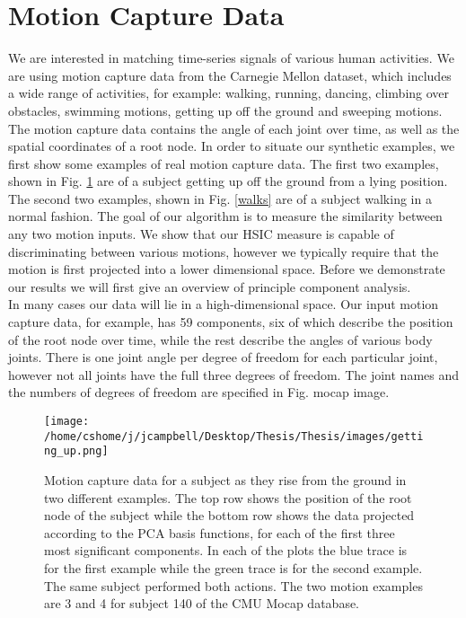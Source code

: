 \section{Motion Capture Data}

We are interested in matching time-series signals of various human activities. We are using motion capture data from the Carnegie Mellon dataset, which includes a wide range of activities, for example: walking, running, dancing, climbing over obstacles, swimming motions, getting up off the ground and sweeping motions. The motion capture data contains the angle of each joint over time, as well as the spatial coordinates of a root node. In order to situate our synthetic examples, we first show some examples of real motion capture data. The first two examples, shown in Fig. \ref{getting_up} are of a subject getting up off the ground from a lying position. The second two examples, shown in Fig. \ref{walks} are of a subject walking in a normal fashion. The goal of our algorithm is to measure the similarity between any two motion inputs. We show that our HSIC measure is capable of discriminating between various motions, however we typically require that the motion is first projected into a lower dimensional space. Before we demonstrate our results we will first give an overview of principle component analysis.\\

In many cases our data will lie in a high-dimensional space. Our input motion capture data, for example, has 59 components, six of which describe the position of the root node over time, while the rest describe the angles of various body joints. There is one joint angle per degree of freedom for each particular joint, however not all joints have the full three degrees of freedom. The joint names and the numbers of degrees of freedom are specified in Fig. {mocap image}.\\

\begin{figure}[h]
\texttt{[image: /home/cshome/j/jcampbell/Desktop/Thesis/Thesis/images/getting\_up.png]}
\caption{Motion capture data for a subject as they rise from the ground in two 	different examples. The top row shows the position of the root node of the subject while the bottom row shows the data projected according to the PCA basis functions, for each of the first three most significant components. In each of the plots the blue trace is for the first example while the green trace is for the second example. The same subject performed both actions. The two motion examples are 3 and 4 for subject 140 of the CMU Mocap database. \label{getting_up}}
\end{figure}

